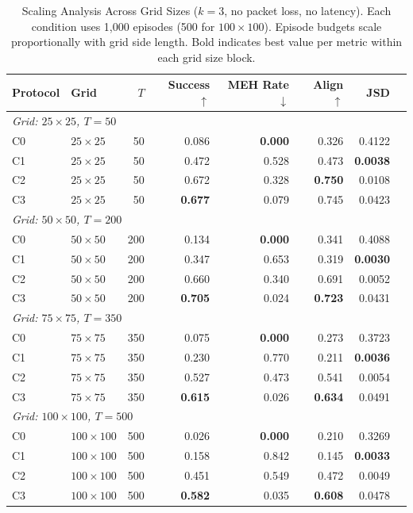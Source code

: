 \documentclass[pdflatex,sn-mathphys-num]{sn-jnl}%
\theoremstyle{thmstyleone}%
\theoremstyle{thmstyletwo}%
\theoremstyle{thmstylethree}%
\begin{document}
\begin{appendices}
\begin{table}[htbp]
\centering
\caption{Scaling Analysis Across Grid Sizes ($k=3$, no packet loss, no latency). Each condition uses 1{,}000 episodes (500 for $100 \times 100$). Episode budgets scale proportionally with grid side length. Bold indicates best value per metric within each grid size block.}
\label{tab:appendix_scaling}
\small
\begin{tabular}{llrrrrrr}
\toprule
Protocol & Grid & $T$ & Success $\uparrow$ & MEH Rate $\downarrow$ & Align $\uparrow$ & JSD\\
\midrule
\multicolumn{7}{l}{\textit{Grid: $25\times 25$, $T=50$}} \\
\addlinespace[2pt]
C0 & $25\times25$ & 50 & 0.086 & \textbf{0.000} & 0.326 & 0.4122 \\
C1 & $25\times25$ & 50 & 0.472 & 0.528 & 0.473 & \textbf{0.0038} \\
C2 & $25\times25$ & 50 & 0.672 & 0.328 & \textbf{0.750} & 0.0108 \\
C3 & $25\times25$ & 50 & \textbf{0.677} & 0.079 & 0.745 & 0.0423 \\
\midrule
\multicolumn{7}{l}{\textit{Grid: $50\times 50$, $T=200$}} \\
\addlinespace[2pt]
C0 & $50\times50$ & 200 & 0.134 & \textbf{0.000} & 0.341 & 0.4088 \\
C1 & $50\times50$ & 200 & 0.347 & 0.653 & 0.319 & \textbf{0.0030} \\
C2 & $50\times50$ & 200 & 0.660 & 0.340 & 0.691 & 0.0052 \\
C3 & $50\times50$ & 200 & \textbf{0.705} & 0.024 & \textbf{0.723} & 0.0431 \\
\midrule
\multicolumn{7}{l}{\textit{Grid: $75\times 75$, $T=350$}} \\
\addlinespace[2pt]
C0 & $75\times75$ & 350 & 0.075 & \textbf{0.000} & 0.273 & 0.3723 \\
C1 & $75\times75$ & 350 & 0.230 & 0.770 & 0.211 & \textbf{0.0036} \\
C2 & $75\times75$ & 350 & 0.527 & 0.473 & 0.541 & 0.0054 \\
C3 & $75\times75$ & 350 & \textbf{0.615} & 0.026 & \textbf{0.634} & 0.0491 \\
\midrule
\multicolumn{7}{l}{\textit{Grid: $100\times 100$, $T=500$}} \\
\addlinespace[2pt]
C0 & $100\times100$ & 500 & 0.026 & \textbf{0.000} & 0.210 & 0.3269 \\
C1 & $100\times100$ & 500 & 0.158 & 0.842 & 0.145 & \textbf{0.0033} \\
C2 & $100\times100$ & 500 & 0.451 & 0.549 & 0.472 & 0.0049 \\
C3 & $100\times100$ & 500 & \textbf{0.582} & 0.035 & \textbf{0.608} & 0.0478 \\
\bottomrule
\end{tabular}
\end{table}


\end{appendices}
\end{document}
